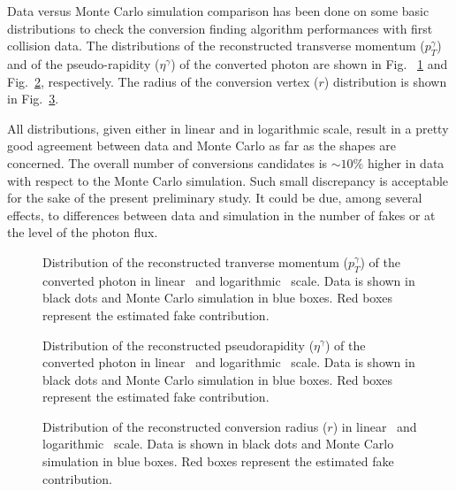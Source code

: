 Data versus Monte Carlo simulation comparison has been done on some basic distributions to check the conversion finding algorithm performances with first collision data. The distributions of the reconstructed transverse momentum ($p^{\gamma}_T$) and of the pseudo-rapidity ($\eta^\gamma$) of the converted photon are shown in Fig. ~\ref{fig:pt} and Fig.~\ref{fig:eta}, respectively. The radius of the conversion vertex ($r$) distribution is shown in Fig.~\ref{fig:r}. 

All distributions, given either in linear and in logarithmic scale, result in a pretty good agreement between data and Monte Carlo as far as the shapes are concerned. The overall number of conversions candidates is $\sim10\%$ higher in data with respect to the Monte Carlo simulation. Such small discrepancy is acceptable for the sake of the present preliminary study. It could be due, among several effects, to differences between data and simulation in the number of fakes or at the level of the photon flux.
\begin{figure}[!hbtp]
\centering
{}
\caption{Distribution of the reconstructed tranverse momentum ($p^{\gamma}_T$) of the converted photon in linear~ and logarithmic~ scale. Data is shown in black dots and Monte Carlo  simulation in blue boxes. Red boxes represent the estimated fake contribution.}
\label{fig:pt}
\end{figure}

\begin{figure}[!hbtp]
\centering
{}
\caption{Distribution of the reconstructed pseudorapidity ($\eta^\gamma$) of the converted photon in linear~ and logarithmic~ scale. Data is shown in black dots and Monte Carlo  simulation in blue boxes. Red boxes represent the estimated fake contribution.}
\label{fig:eta}
\end{figure}

\begin{figure}[!hbtp]
\centering
{}
\caption{Distribution of the reconstructed conversion radius ($r$) in linear~ and logarithmic~ scale. Data is shown in black dots and Monte Carlo simulation in blue boxes. Red boxes represent the estimated fake contribution.}
\label{fig:r}
\end{figure}
